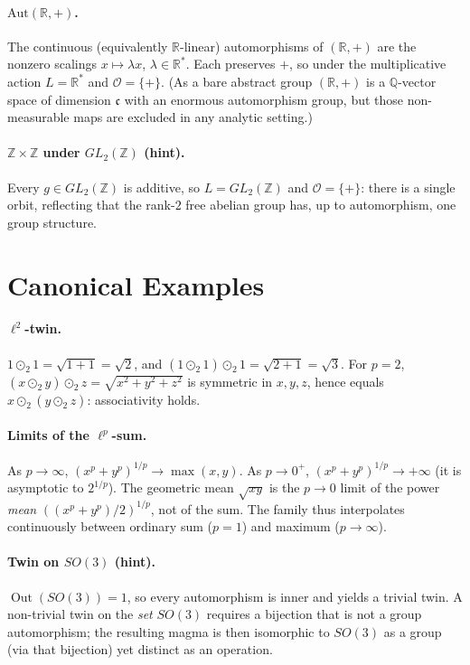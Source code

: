 \documentclass[11pt,a4paper,openany]{book}
\theoremstyle{plain}
\theoremstyle{definition}
\newcommand{\twing}[1]{\odot_{#1}}
\newcommand{\opspace}{\mathcal{O}}
\newcommand{\lingroup}{L}
\newcommand{\RR}{\mathbb{R}}
\newcommand{\ZZ}{\mathbb{Z}}
\newcommand{\Aut}{\mathrm{Aut}}
\begin{document}
\paragraph{$\Aut(\RR,+)$.}
The continuous (equivalently $\RR$-linear) automorphisms of $(\RR,+)$ are the nonzero scalings $x\mapsto\lambda x$, $\lambda\in\RR^*$. Each preserves $+$, so under the multiplicative action $\lingroup=\RR^*$ and $\opspace=\{+\}$. (As a bare abstract group $(\RR,+)$ is a $\mathbb{Q}$-vector space of dimension $\mathfrak{c}$ with an enormous automorphism group, but those non-measurable maps are excluded in any analytic setting.)

\paragraph{$\ZZ\times\ZZ$ under $GL_2(\ZZ)$ (hint).}
Every $g\in GL_2(\ZZ)$ is additive, so $\lingroup=GL_2(\ZZ)$ and $\opspace=\{+\}$: there is a single orbit, reflecting that the rank-$2$ free abelian group has, up to automorphism, one group structure.

\section*{Canonical Examples}

\paragraph{$\ell^2$-twin.}
$1\twing{2}1=\sqrt{1+1}=\sqrt2$, and $(1\twing{2}1)\twing{2}1=\sqrt{2+1}=\sqrt3$. For $p=2$, $(x\twing{2}y)\twing{2}z=\sqrt{x^2+y^2+z^2}$ is symmetric in $x,y,z$, hence equals $x\twing{2}(y\twing{2}z)$: associativity holds.

\paragraph{Limits of the $\ell^p$-sum.}
As $p\to\infty$, $(x^p+y^p)^{1/p}\to\max(x,y)$. As $p\to0^+$, $(x^p+y^p)^{1/p}\to+\infty$ (it is asymptotic to $2^{1/p}$). The geometric mean $\sqrt{xy}$ is the $p\to0$ limit of the power \emph{mean} $((x^p+y^p)/2)^{1/p}$, not of the sum. The family thus interpolates continuously between ordinary sum ($p=1$) and maximum ($p\to\infty$).

\paragraph{Twin on $SO(3)$ (hint).}
$\operatorname{Out}(SO(3))=1$, so every automorphism is inner and yields a trivial twin. A non-trivial twin on the \emph{set} $SO(3)$ requires a bijection that is not a group automorphism; the resulting magma is then isomorphic to $SO(3)$ as a group (via that bijection) yet distinct as an operation.
\end{document}
